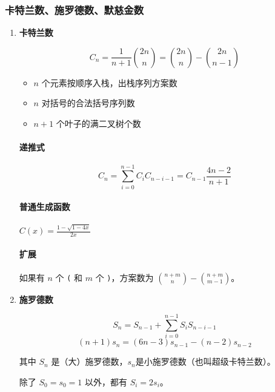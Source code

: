 \documentclass[a4paper, twoside]{article}
\begin{document}
        \subsubsection{卡特兰数、施罗德数、默慈金数}
        \begin{enumerate}
    
            \item \textbf{卡特兰数}
            \label{catalan}
            
            $$C_n = \frac 1 {n + 1}{2n\choose n} = {2n \choose n} - {2n \choose n - 1}$$
            
            \begin{itemize}
                \item $n$ 个元素按顺序入栈，出栈序列方案数
                \item $n$ 对括号的合法括号序列数
                \item $n + 1$ 个叶子的满二叉树个数
            \end{itemize}
            
            \paragraph{递推式}
            $$ C_n = \sum_{i = 0} ^ {n - 1} C_i C_{n - i - 1} = C_{n - 1} \frac {4n - 2} {n + 1} $$
            
            \paragraph{普通生成函数} $C(x) = \frac {1 - \sqrt {1 - 4 x}} {2 x}$
            
            \paragraph{扩展} 如果有 $n$ 个 \texttt{(} 和 $m$ 个 \texttt{)}，方案数为 ${n + m \choose n} - {n + m \choose m - 1}$。
            
            \item \textbf{施罗德数}
            
            $$ S_n = S_{n-1} + \sum_{i = 0} ^ {n - 1} S_i S_{n - i - 1} $$
            $$ (n + 1)s_n = (6n - 3)s_{n - 1} - (n - 2) s_{n - 2} $$
            
            其中 $S_n$ 是（大）施罗德数，$s_n$是小施罗德数（也叫超级卡特兰数）。
            
            除了 $S_0 = s_0 = 1$ 以外，都有 $S_i = 2s_i$。
            

\end{enumerate}
\end{document}
